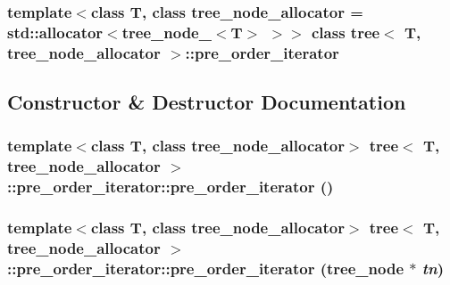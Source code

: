 \subsubsection*{template$<$class T, class tree\_\-node\_\-allocator = std::allocator$<$tree\_\-node\_\-$<$T$>$ $>$$>$ class tree$<$ T, tree\_\-node\_\-allocator $>$::pre\_\-order\_\-iterator}



\subsection{Constructor \& Destructor Documentation}
\hypertarget{classtree_1_1pre__order__iterator_aa4abe430ae678fa7d7753d9599be049}{
\subsubsection{\setlength{\rightskip}{0pt plus 5cm}template$<$class T, class tree\_\-node\_\-allocator$>$ {\bf tree}$<$ T, tree\_\-node\_\-allocator $>$::pre\_\-order\_\-iterator::pre\_\-order\_\-iterator ()}}
\label{classtree_1_1pre__order__iterator_aa4abe430ae678fa7d7753d9599be049}


\hypertarget{classtree_1_1pre__order__iterator_afdaf0da69c4406b916c14c5589fa391}{
\subsubsection{\setlength{\rightskip}{0pt plus 5cm}template$<$class T, class tree\_\-node\_\-allocator$>$ {\bf tree}$<$ T, tree\_\-node\_\-allocator $>$::pre\_\-order\_\-iterator::pre\_\-order\_\-iterator ({\bf tree\_\-node} $\ast$ {\em tn})}}
\label{classtree_1_1pre__order__iterator_afdaf0da69c4406b916c14c5589fa391}


